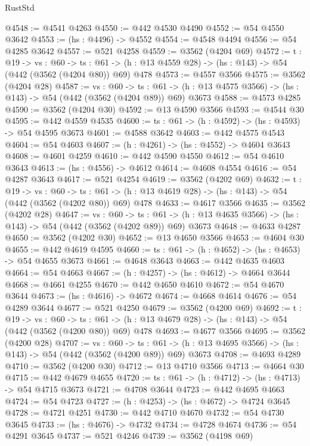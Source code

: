 \begin{lexlean}{RustStd}
\begin{coremodule}
@4548 := @4541 @4263
@4550 := @442 @4530 @4490
@4552 := @54 @4550 @3642
@4553 := (hs : @4496) -> @4552
@4554 := @4548 @4494
@4556 := @54 @4285 @3642
@4557 := @521 @4258
@4559 := @3562 (@4204 @69)
@4572 := {t : @19} ->
  {vs : @60} ->
  {ts : @61} -> (h : @13 @4559 @28) -> (hs : @143) -> @54 (@442 (@3562 (@4204 @80)) @69) @478
@4573 := @4557 @3566
@4575 := @3562 (@4204 @28)
@4587 := {vs : @60} ->
  {ts : @61} -> (h : @13 @4575 @3566) -> (hs : @143) -> @54 (@442 (@3562 (@4204 @89)) @69) @3673
@4588 := @4573 @4285
@4590 := @3562 (@4204 @30)
@4592 := @13 @4590 @3566
@4593 := @4544 @30
@4595 := @442 @4559 @4535
@4600 := {ts : @61} -> (h : @4592) -> (hs : @4593) -> @54 @4595 @3673
@4601 := @4588 @3642
@4603 := @442 @4575 @4543
@4604 := @54 @4603
@4607 := (h : @4261) -> (hs : @4552) -> @4604 @3643
@4608 := @4601 @4259
@4610 := @442 @4590 @4550
@4612 := @54 @4610 @3643
@4613 := (hs : @4556) -> @4612
@4614 := @4608 @4554
@4616 := @54 @4287 @3643
@4617 := @521 @4254
@4619 := @3562 (@4202 @69)
@4632 := {t : @19} ->
  {vs : @60} ->
  {ts : @61} -> (h : @13 @4619 @28) -> (hs : @143) -> @54 (@442 (@3562 (@4202 @80)) @69) @478
@4633 := @4617 @3566
@4635 := @3562 (@4202 @28)
@4647 := {vs : @60} ->
  {ts : @61} -> (h : @13 @4635 @3566) -> (hs : @143) -> @54 (@442 (@3562 (@4202 @89)) @69) @3673
@4648 := @4633 @4287
@4650 := @3562 (@4202 @30)
@4652 := @13 @4650 @3566
@4653 := @4604 @30
@4655 := @442 @4619 @4595
@4660 := {ts : @61} -> (h : @4652) -> (hs : @4653) -> @54 @4655 @3673
@4661 := @4648 @3643
@4663 := @442 @4635 @4603
@4664 := @54 @4663
@4667 := (h : @4257) -> (hs : @4612) -> @4664 @3644
@4668 := @4661 @4255
@4670 := @442 @4650 @4610
@4672 := @54 @4670 @3644
@4673 := (hs : @4616) -> @4672
@4674 := @4668 @4614
@4676 := @54 @4289 @3644
@4677 := @521 @4250
@4679 := @3562 (@4200 @69)
@4692 := {t : @19} ->
  {vs : @60} ->
  {ts : @61} -> (h : @13 @4679 @28) -> (hs : @143) -> @54 (@442 (@3562 (@4200 @80)) @69) @478
@4693 := @4677 @3566
@4695 := @3562 (@4200 @28)
@4707 := {vs : @60} ->
  {ts : @61} -> (h : @13 @4695 @3566) -> (hs : @143) -> @54 (@442 (@3562 (@4200 @89)) @69) @3673
@4708 := @4693 @4289
@4710 := @3562 (@4200 @30)
@4712 := @13 @4710 @3566
@4713 := @4664 @30
@4715 := @442 @4679 @4655
@4720 := {ts : @61} -> (h : @4712) -> (hs : @4713) -> @54 @4715 @3673
@4721 := @4708 @3644
@4723 := @442 @4695 @4663
@4724 := @54 @4723
@4727 := (h : @4253) -> (hs : @4672) -> @4724 @3645
@4728 := @4721 @4251
@4730 := @442 @4710 @4670
@4732 := @54 @4730 @3645
@4733 := (hs : @4676) -> @4732
@4734 := @4728 @4674
@4736 := @54 @4291 @3645
@4737 := @521 @4246
@4739 := @3562 (@4198 @69)

\end{coremodule}
\end{lexlean}
